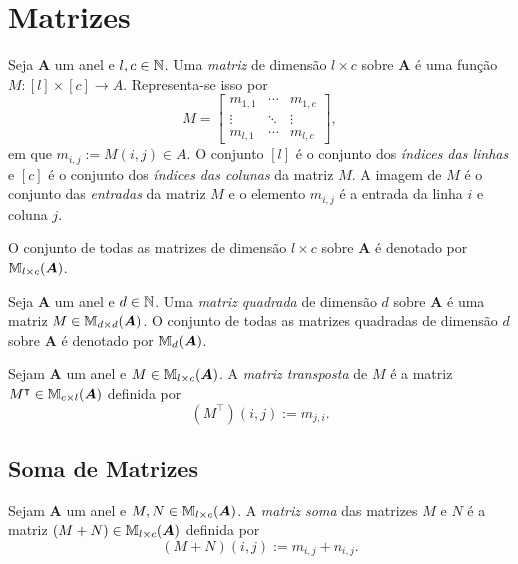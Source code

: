 \section{Matrizes}

\begin{defi}
	Seja $\bm A$ um anel e $l,c \in \mathbb{N}$. Uma \emph{matriz} de dimensão $l \times c$ sobre $\bm A$ é uma função $M: [l] \times [c] \to A$. Representa-se isso por
	\begin{equation*}
	M =
	\begin{bmatrix}
	m_{1,1} & \cdots & m_{1,c} \\
	\vdots & \ddots & \vdots \\
	m_{l,1} & \cdots & m_{l,c}
	\end{bmatrix},
	\end{equation*}
em que $m_{i,j} := M(i,j) \in A$. O conjunto $[l]$ é o conjunto dos \emph{índices das linhas} e $[c]$ é o conjunto dos \emph{índices das colunas} da matriz $M$. A imagem de $M$ é o conjunto das \emph{entradas} da matriz $M$ e o elemento $m_{i,j}$ é a entrada da linha $i$ e coluna $j$.

	O conjunto de todas as matrizes de dimensão $l \times c$ sobre $\bm A$ é denotado por $\mathbb{M}_{l \times c}(\bm A)$.
\end{defi}

\begin{defi}
	Seja $\bm A$ um anel e $d \in \mathbb{N}$. Uma \emph{matriz quadrada} de dimensão $d$ sobre $\bm A$ é uma matriz $M \in \mathbb{M}_{d \times d}(\bm A)$. O conjunto de todas as matrizes quadradas de dimensão $d$ sobre $\bm A$ é denotado por $\mathbb{M}_d(\bm A)$.
\end{defi}

\begin{defi}
	Sejam $\bm A$ um anel e $M \in \mathbb{M}_{l \times c}(\bm A)$. A \emph{matriz transposta} de $M$ é a matriz $M^\intercal \in \mathbb{M}_{c \times l}(\bm A)$ definida por
	\begin{equation*}
	(M^\intercal)(i,j) := m_{j,i}.
	\end{equation*}
\end{defi}

\subsection{Soma de Matrizes}

\begin{defi}
	Sejam $\bm A$ um anel e $M,N \in \mathbb{M}_{l \times c}(\bm A)$. A \emph{matriz soma} das matrizes $M$ e $N$ é a matriz $(M+N) \in \mathbb{M}_{l \times c}(\bm A)$ definida por
	\begin{equation*}
	(M+N)(i,j) := m_{i,j}+n_{i,j}.
	\end{equation*}
\end{defi}

